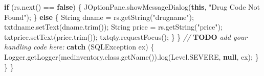 \documentclass[
  10pt,
]{article}
\newenvironment{Shaded}{}{}
\newcommand{\AlertTok}[1]{\textcolor[rgb]{1.00,0.00,0.00}{\textbf{#1}}}
\newcommand{\BuiltInTok}[1]{\textcolor[rgb]{0.00,0.50,0.00}{#1}}
\newcommand{\CommentTok}[1]{\textcolor[rgb]{0.38,0.63,0.69}{\textit{#1}}}
\newcommand{\ControlFlowTok}[1]{\textcolor[rgb]{0.00,0.44,0.13}{\textbf{#1}}}
\newcommand{\FunctionTok}[1]{\textcolor[rgb]{0.02,0.16,0.49}{#1}}
\newcommand{\KeywordTok}[1]{\textcolor[rgb]{0.00,0.44,0.13}{\textbf{#1}}}
\newcommand{\NormalTok}[1]{#1}
\newcommand{\OperatorTok}[1]{\textcolor[rgb]{0.40,0.40,0.40}{#1}}
\newcommand{\StringTok}[1]{\textcolor[rgb]{0.25,0.44,0.63}{#1}}
\begin{document}
\begin{Shaded}
\begin{Highlighting}[numbers=left,,]
                \ControlFlowTok{if} \OperatorTok{(}\NormalTok{rs}\OperatorTok{.}\FunctionTok{next}\OperatorTok{()} \OperatorTok{==} \KeywordTok{false}\OperatorTok{)} \OperatorTok{\{}
                    \BuiltInTok{JOptionPane}\OperatorTok{.}\FunctionTok{showMessageDialog}\OperatorTok{(}\KeywordTok{this}\OperatorTok{,} \StringTok{"Drug Code Not Found"}\OperatorTok{);}
                \OperatorTok{\}} \ControlFlowTok{else} \OperatorTok{\{}
                    \BuiltInTok{String}\NormalTok{ dname }\OperatorTok{=}\NormalTok{ rs}\OperatorTok{.}\FunctionTok{getString}\OperatorTok{(}\StringTok{"drugname"}\OperatorTok{);}
\NormalTok{                    txtdname}\OperatorTok{.}\FunctionTok{setText}\OperatorTok{(}\NormalTok{dname}\OperatorTok{.}\FunctionTok{trim}\OperatorTok{());}
                    \BuiltInTok{String}\NormalTok{ price }\OperatorTok{=}\NormalTok{ rs}\OperatorTok{.}\FunctionTok{getString}\OperatorTok{(}\StringTok{"price"}\OperatorTok{);}
\NormalTok{                    txtprice}\OperatorTok{.}\FunctionTok{setText}\OperatorTok{(}\NormalTok{price}\OperatorTok{.}\FunctionTok{trim}\OperatorTok{());}
\NormalTok{                    txtqty}\OperatorTok{.}\FunctionTok{requestFocus}\OperatorTok{();}
                \OperatorTok{\}}
            \OperatorTok{\}} \CommentTok{// }\AlertTok{TODO}\CommentTok{ add your handling code here:}
            \ControlFlowTok{catch} \OperatorTok{(}\BuiltInTok{SQLException}\NormalTok{ ex}\OperatorTok{)} \OperatorTok{\{}
                \BuiltInTok{Logger}\OperatorTok{.}\FunctionTok{getLogger}\OperatorTok{(}\NormalTok{medinventory}\OperatorTok{.}\FunctionTok{class}\OperatorTok{.}\FunctionTok{getName}\OperatorTok{()).}\FunctionTok{log}\OperatorTok{(}\BuiltInTok{Level}\OperatorTok{.}\FunctionTok{SEVERE}\OperatorTok{,} \KeywordTok{null}\OperatorTok{,}\NormalTok{ ex}\OperatorTok{);}
            \OperatorTok{\}}
        \OperatorTok{\}}
    \OperatorTok{\}}                                   


\end{Highlighting}
\end{Shaded}
\end{document}
